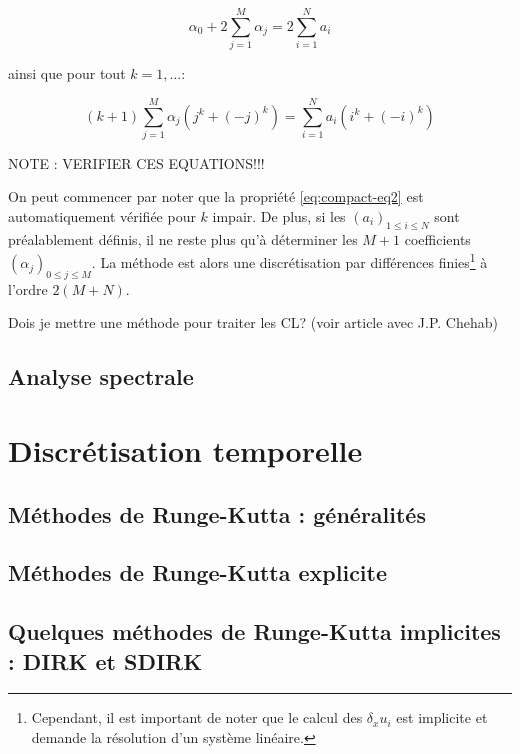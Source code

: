 \begin{equation}
  \label{eq:compact-eq1}
  \alpha_0 + 2 \sum_{j=1}^M \alpha_j = 2 \sum_{i=1}^N a_i
\end{equation}

ainsi que pour tout $k=1, ...$:

\begin{equation}
  \label{eq:compact-eq2}
  \left( k+1 \right) \sum_{j=1}^M \alpha_j \left( j^k + (-j)^k \right) = \sum_{i=1}^N a_i \left( i^k + (-i)^k \right)
\end{equation}

NOTE : VERIFIER CES EQUATIONS!!!

On peut commencer par noter que la propriété \eqref{eq:compact-eq2} est automatiquement vérifiée pour $k$ impair. De plus, si les $(a_i)_{1 \leq i \leq N}$ sont préalablement définis, il ne reste plus qu'à déterminer les $M+1$ coefficients $(\alpha_j)_{0 \leq j \leq M}$. La méthode est alors une discrétisation par différences finies\footnote{Cependant, il est important de noter que le calcul des $\delta_x u_i$ est implicite et demande la résolution d'un système linéaire.} à l'ordre $2(M+N)$.








Dois je mettre une méthode pour traiter les CL? (voir article avec J.P. Chehab)

\subsection{Analyse spectrale}


\section{Discrétisation temporelle}

\subsection{Méthodes de Runge-Kutta : généralités}

\subsection{Méthodes de Runge-Kutta explicite}

\subsection{Quelques méthodes de Runge-Kutta implicites : DIRK et SDIRK}


